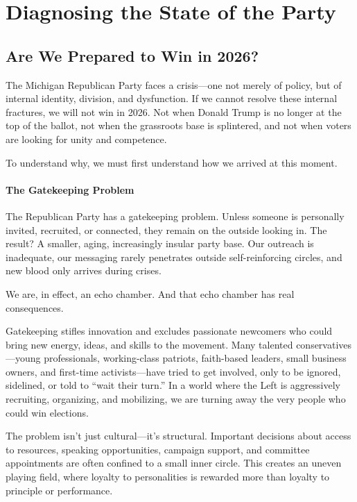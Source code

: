 \part{Diagnosing the State of the Party}

\chapter{Are We Prepared to Win in 2026?}

The Michigan Republican Party faces a crisis—one not merely of policy, but of internal identity, division, and dysfunction. If we cannot resolve these internal fractures, we will not win in 2026. Not when Donald Trump is no longer at the top of the ballot, not when the grassroots base is splintered, and not when voters are looking for unity and competence.

To understand why, we must first understand how we arrived at this moment.

\subsection{The Gatekeeping Problem}

The Republican Party has a gatekeeping problem. Unless someone is personally invited, recruited, or connected, they remain on the outside looking in. The result? A smaller, aging, increasingly insular party base. Our outreach is inadequate, our messaging rarely penetrates outside self-reinforcing circles, and new blood only arrives during crises.

We are, in effect, an echo chamber. And that echo chamber has real consequences.

Gatekeeping stifles innovation and excludes passionate newcomers who could bring new energy, ideas, and skills to the movement. Many talented conservatives---young professionals, working-class patriots, faith-based leaders, small business owners, and first-time activists---have tried to get involved, only to be ignored, sidelined, or told to “wait their turn.” In a world where the Left is aggressively recruiting, organizing, and mobilizing, we are turning away the very people who could win elections.

The problem isn't just cultural---it's structural. Important decisions about access to resources, speaking opportunities, campaign support, and committee appointments are often confined to a small inner circle. This creates an uneven playing field, where loyalty to personalities is rewarded more than loyalty to principle or performance.

